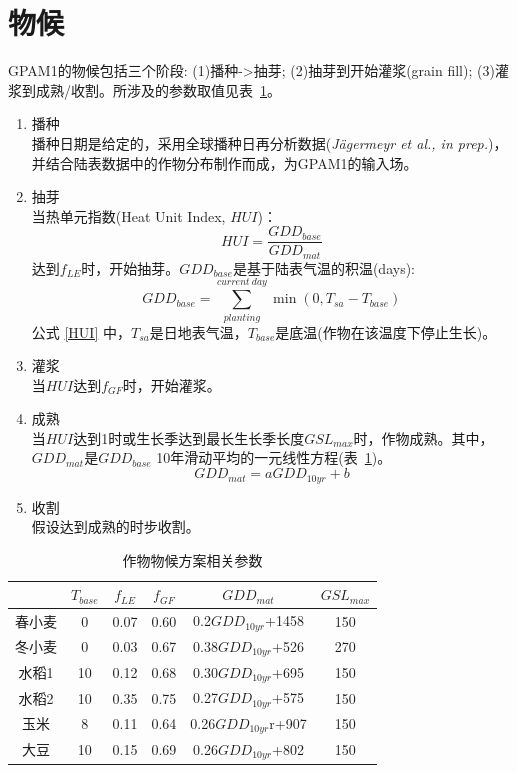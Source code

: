 \section{物候}
GPAM1的物候包括三个阶段: (1)播种->抽芽; (2)抽芽到开始灌浆(grain fill); (3)灌浆到成熟/收割。所涉及的参数取值见表~\ref{tab:作物物候方案相关参数}。

\begin{enumerate}
  \item 播种\\
  播种日期是给定的，采用全球播种日再分析数据(\textit{Jägermeyr et al., in prep.})，并结合陆表数据中的作物分布制作而成，为GPAM1的输入场。
  \item 抽芽\\
  当热单元指数(Heat Unit Index, $HUI$)：
  \begin{equation}\label{HUI}
  HUI=\frac{GDD_{base}}{GDD_{mat}}
  \end{equation}
  达到$f_{LE}$时，开始抽芽。$GDD_{base}$是基于陆表气温的积温(\textcelsius days):
  \begin{equation}
  GDD_{ {base }}=\sum_{planting}^{current\ day} \min \left(0, T_{sa}-T_{base}\right)
  \end{equation}
  公式 \eqref{HUI} 中，$T_{sa}$是日地表气温，$T_{base}$是底温(作物在该温度下停止生长)。\\
  \item 灌浆\\
  当$HUI$达到$f_{GF}$时，开始灌浆。
  \item 成熟\\
  当$HUI$达到1时或生长季达到最长生长季长度$GSL_{max}$时，作物成熟。其中，$GDD_{mat}$是$GDD_{base}$ 
  10年滑动平均的一元线性方程(表~\ref{tab:作物物候方案相关参数})。
  \begin{equation}
    GDD_{mat}=a GDD_{10yr}+b
  \end{equation}
  \item 收割\\
  假设达到成熟的时步收割。
\end{enumerate}
\begin{table}[htbp]
  \centering
  \caption{作物物候方案相关参数}
  \label{tab:作物物候方案相关参数}
\begin{tabular}{@{}cccccc@{}}
\toprule
    & $T_{base}$ & $f_{LE}$  & $f_{GF}$  & $GDD_{mat}$          & $GSL_{max}$ \\ \midrule
春小麦 & 0     & 0.07 & 0.60 & 0.2$GDD_{10yr}$+1458 & 150    \\
冬小麦 & 0     & 0.03 & 0.67 & 0.38$GDD_{10yr}$+526 & 270    \\
水稻1 & 10    & 0.12 & 0.68 & 0.30$GDD_{10yr}$+695 & 150    \\
水稻2 & 10    & 0.35 & 0.75 & 0.27$GDD_{10yr}$+575 & 150    \\
玉米  & 8     & 0.11 & 0.64 & 0.26$GDD_{10yr}$r+907 & 150    \\
大豆  & 10    & 0.15 & 0.69 & 0.26$GDD_{10yr}$+802 & 150    \\ \bottomrule
\end{tabular}
\end{table}

